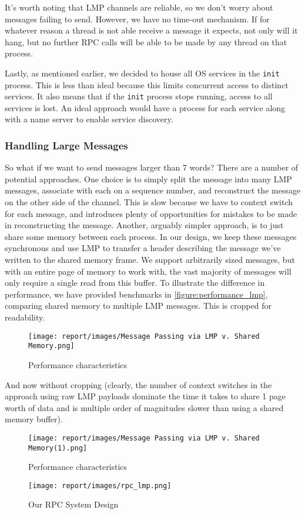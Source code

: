It's worth noting that LMP channels are reliable, so we don't worry about messages failing to send. However, we have no time-out mechanism. If for whatever reason a thread is not able receive a message it expects, not only will it hang, but no further RPC calls will be able to be made by any thread on that process.

Lastly, as mentioned earlier, we decided to house all OS services in the \verb|init| process. This is less than ideal because this limits concurrent access to distinct services. It also means that if the \verb|init| process stops running, access to all services is lost. An ideal approach would have a process for each service along with a name server to enable service discovery.


\subsubsection*{Handling Large Messages} \label{sec:extending}

So what if we want to send messages larger than 7 words? There are a number of potential approaches. One choice is to simply split the message into many LMP messages, associate with each on a sequence number, and reconstruct the message on the other side of the channel. This is slow because we have to context switch for each message, and introduces plenty of opportunities for mistakes to be made in reconstructing the message. Another, arguably simpler approach, is to just share some memory between each process. In our design, we keep these messages synchronous and use LMP to transfer a header describing the message we've written to the shared memory frame. We support arbitrarily sized messages, but with an entire page of memory to work with, the vast majority of messages will only require a single read from this buffer. To illustrate the difference in performance, we have provided benchmarks in \autoref{figure:performance_lmp}, comparing shared memory to multiple LMP messages. This is cropped for readability. 
\begin{figure}[h!] 
	\texttt{[image: report/images/Message Passing via LMP v. Shared Memory.png]}
	\caption{Performance characteristics}
	\label{figure:performance_lmp}
	\centering
\end{figure}

And now without cropping (clearly, the number of context switches in the approach using raw LMP payloads dominate the time it takes to share 1 page worth of data and is multiple order of magnitudes slower than using a shared memory buffer).
\begin{figure}[h] 
	\texttt{[image: report/images/Message Passing via LMP v. Shared Memory(1).png]}
	\caption{Performance characteristics}
	\label{figure:performance_lmp_uncrop}
	\centering
\end{figure}

\begin{figure*}[h] 
	\texttt{[image: report/images/rpc\_lmp.png]}
	\caption{Our RPC System Design}
	\label{figure:big_picture}
	\centering
\end{figure*}

